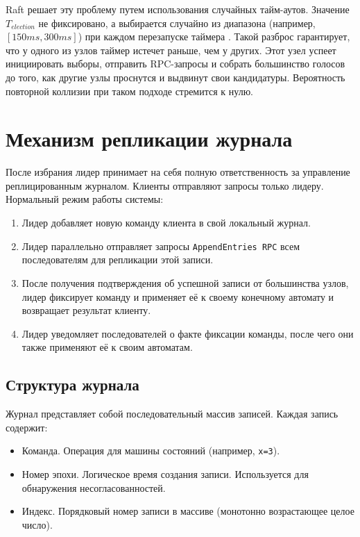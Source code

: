 Raft решает эту проблему путем использования случайных тайм-аутов. Значение $T_{election}$ не фиксировано, а выбирается случайно из диапазона (например, $[150ms, 300ms]$) при каждом перезапуске таймера \cite{raft_original}.
Такой разброс гарантирует, что у одного из узлов таймер истечет раньше, чем у других. Этот узел успеет инициировать выборы, отправить RPC-запросы и собрать большинство голосов до того, как другие узлы проснутся и выдвинут свои кандидатуры. Вероятность повторной коллизии при таком подходе стремится к нулю.

\section{Механизм репликации журнала}

После избрания лидер принимает на себя полную ответственность за управление реплицированным журналом. Клиенты отправляют запросы только лидеру. Нормальный режим работы системы:

\begin{enumerate}
    \item Лидер добавляет новую команду клиента в свой локальный журнал.
    \item Лидер параллельно отправляет запросы \texttt{AppendEntries RPC} всем последователям для репликации этой записи.
    \item После получения подтверждения об успешной записи от большинства узлов, лидер фиксирует команду и применяет её к своему конечному автомату и возвращает результат клиенту.
    \item Лидер уведомляет последователей о факте фиксации команды, после чего они также применяют её к своим автоматам.
\end{enumerate}

\subsection{Структура журнала}

Журнал представляет собой последовательный массив записей. Каждая запись содержит:
\begin{itemize}
    \item Команда. Операция для машины состояний (например, \texttt{x=3}).
    \item Номер эпохи. Логическое время создания записи. Используется для обнаружения несогласованностей.
    \item Индекс. Порядковый номер записи в массиве (монотонно возрастающее целое число).
\end{itemize}

